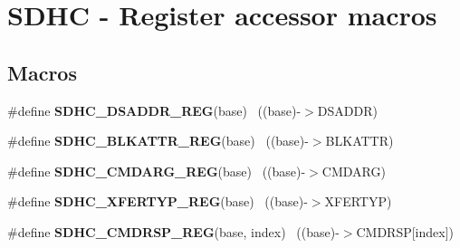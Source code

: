 \hypertarget{group___s_d_h_c___register___accessor___macros}{}\section{S\+D\+H\+C -\/ Register accessor macros}
\label{group___s_d_h_c___register___accessor___macros}
\subsection*{Macros}
\begin{DoxyCompactItemize}
\item 
\hypertarget{group___s_d_h_c___register___accessor___macros_gaff5fe2696bbe46c19405b9a26bade43b}{}\#define {\bfseries S\+D\+H\+C\+\_\+\+D\+S\+A\+D\+D\+R\+\_\+\+R\+E\+G}(base)                                    ~((base)-\/$>$D\+S\+A\+D\+D\+R)\label{group___s_d_h_c___register___accessor___macros_gaff5fe2696bbe46c19405b9a26bade43b}

\item 
\hypertarget{group___s_d_h_c___register___accessor___macros_ga4e25f7d2c643d77255560ebe463e2e83}{}\#define {\bfseries S\+D\+H\+C\+\_\+\+B\+L\+K\+A\+T\+T\+R\+\_\+\+R\+E\+G}(base)                                  ~((base)-\/$>$B\+L\+K\+A\+T\+T\+R)\label{group___s_d_h_c___register___accessor___macros_ga4e25f7d2c643d77255560ebe463e2e83}

\item 
\hypertarget{group___s_d_h_c___register___accessor___macros_gab64cab6a76d88f1503d93bc85a8c6b8e}{}\#define {\bfseries S\+D\+H\+C\+\_\+\+C\+M\+D\+A\+R\+G\+\_\+\+R\+E\+G}(base)                                    ~((base)-\/$>$C\+M\+D\+A\+R\+G)\label{group___s_d_h_c___register___accessor___macros_gab64cab6a76d88f1503d93bc85a8c6b8e}

\item 
\hypertarget{group___s_d_h_c___register___accessor___macros_ga563a47325e0aa457d7b61679cfe69a53}{}\#define {\bfseries S\+D\+H\+C\+\_\+\+X\+F\+E\+R\+T\+Y\+P\+\_\+\+R\+E\+G}(base)                                  ~((base)-\/$>$X\+F\+E\+R\+T\+Y\+P)\label{group___s_d_h_c___register___accessor___macros_ga563a47325e0aa457d7b61679cfe69a53}

\item 
\hypertarget{group___s_d_h_c___register___accessor___macros_ga286b1184e03e0b6c8fa5f4ff609b2d42}{}\#define {\bfseries S\+D\+H\+C\+\_\+\+C\+M\+D\+R\+S\+P\+\_\+\+R\+E\+G}(base,  index)                        ~((base)-\/$>$C\+M\+D\+R\+S\+P\mbox{[}index\mbox{]})\label{group___s_d_h_c___register___accessor___macros_ga286b1184e03e0b6c8fa5f4ff609b2d42}


\end{DoxyCompactItemize}
